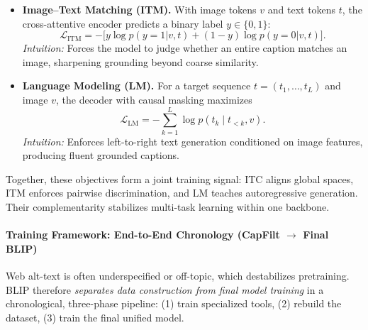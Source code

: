 \begin{enrichment}
\begin{enrichment}
\begin{itemize}
            \item \textbf{Image--Text Matching (ITM).}  
            With image tokens $v$ and text tokens $t$, the cross-attentive encoder predicts a binary label $y \in \{0,1\}$:
            \[
            \mathcal{L}_{\mathrm{ITM}} = - \big[ y \log p(y{=}1|v,t) + (1-y)\log p(y{=}0|v,t) \big].
            \]
            \emph{Intuition:} Forces the model to judge whether an entire caption matches an image, sharpening grounding beyond coarse similarity.
            
            \item \textbf{Language Modeling (LM).}  
            For a target sequence $t = (t_1,\ldots,t_L)$ and image $v$, the decoder with causal masking maximizes
            \[
            \mathcal{L}_{\mathrm{LM}} = - \sum_{k=1}^L \log p(t_k \mid t_{<k}, v).
            \]
            \emph{Intuition:} Enforces left-to-right text generation conditioned on image features, producing fluent grounded captions.
        \end{itemize}
        
        Together, these objectives form a joint training signal: ITC aligns global spaces, ITM enforces pairwise discrimination, and LM teaches autoregressive generation. Their complementarity stabilizes multi-task learning within one backbone.
        
        \paragraph{Training Framework: End-to-End Chronology (CapFilt $\rightarrow$ Final BLIP)}
        Web alt-text is often underspecified or off-topic, which destabilizes pretraining. BLIP therefore \emph{separates data construction from final model training} in a chronological, three-phase pipeline: (1) train specialized tools, (2) rebuild the dataset, (3) train the final unified model.
        

\end{enrichment}
\end{enrichment}

